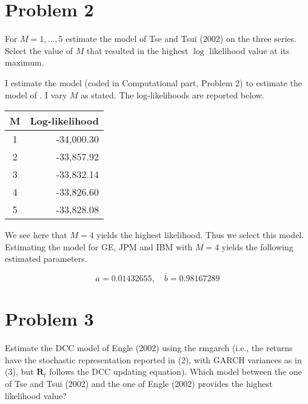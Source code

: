 \documentclass{EconHomework}
\begin{document}
\section{Problem 2}
\begin{tcolorbox}[colback=white]
    For $M=1, \ldots, 5$ estimate the model of Tse and Tsui (2002) on the three series. Select the value of $M$ that resulted in the highest $\log$ likelihood value at its maximum.
\end{tcolorbox}

I estimate the model (coded in Computational part, Problem 2) to estimate the model of \cite{tsetsui2002}. I vary $M$ as stated. The log-likelihoods are reported below.

\begin{table}[H]
    \centering
    \begin{tabular}{ c | r }
        \textbf{M} & \textbf{Log-likelihood}\\
        \hline
        1 & -34,000.30 \\
        2 & -33,857.92 \\
        3 & -33,832.14 \\
        4 & -33,826.60 \\
        5 & -33,828.08 \\
    \end{tabular}
\end{table}

We see here that $M=4$ yields the highest likelihood. Thus we select this model. Estimating the model for GE, JPM and IBM with $M=4$ yields the following estimated parameters.

\begin{equation*}
    \overline{a}=0.01432655,\quad \overline{b}=0.98167289
\end{equation*}

\pagebreak

\section{Problem 3}
\begin{tcolorbox}[colback=white]
    Estimate the DCC model of Engle (2002) using the rmgarch (i.e., the returns have the stochastic representation reported in (2), with GARCH variances as in (3), but $\mathbf{R}_{t}$ follows the DCC updating equation). Which model between the one of Tse and Tsui (2002) and the one of Engle (2002) provides the highest likelihood value?
\end{tcolorbox}
\end{document}
